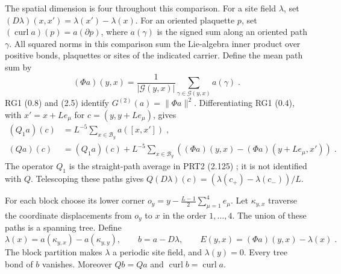 \documentclass[11pt]{article}
\begin{document}
The spatial dimension is four throughout this comparison. For a site field $\lambda$, set $(D\lambda)(x,x')=\lambda(x')-\lambda(x)$. For an oriented plaquette $p$, set $(\operatorname{curl}a)(p)=a(\partial p)$, where $a(\gamma)$ is the signed sum along an oriented path $\gamma$. All squared norms in this comparison sum the Lie-algebra inner product over positive bonds, plaquettes or sites of the indicated carrier. Define the mean path sum by
\begin{equation}\label{eq:covariance-mean-path}
    (\Phi a)(y,x)=\frac{1}{|\mathcal G(y,x)|}
        \sum_{\gamma\in\mathcal G(y,x)}a(\gamma)\;.
\end{equation}
RG1 (0.8) and (2.5) identify $G^{(2)}(a)=\|\Phi a\|^2$. Differentiating RG1 (0.4), with $x'=x+Le_\mu$ for $c=(y,y+Le_\mu)$, gives
\begin{equation}\label{eq:covariance-two-averages}
    \begin{aligned}
        (Q_1a)(c)&=L^{-5}\sum_{x\in\mathcal B_y}a([x,x'])\;,\\
        (Qa)(c)&=(Q_1a)(c)
            +L^{-5}\sum_{x\in\mathcal B_y}
                ((\Phi a)(y,x)-(\Phi a)(y+Le_\mu,x'))\;.
    \end{aligned}
\end{equation}
The operator $Q_1$ is the straight-path average in PRT2 (2.125) \cite{BalabanPRT2}; it is not identified with $Q$. Telescoping these paths gives $Q(D\lambda)(c)=(\lambda(c_+)-\lambda(c_-))/L$.

For each block choose its lower corner $o_y=y-\frac{L-1}{2}\sum_{\mu=1}^4 e_\mu$. Let $\kappa_{y,x}$ traverse the coordinate displacements from $o_y$ to $x$ in the order $1,\ldots,4$. The union of these paths is a spanning tree. Define
\begin{equation}\label{eq:covariance-tree-gauge}
    \lambda(x)=a(\kappa_{y,x})-a(\kappa_{y,y}),
    \qquad b=a-D\lambda,
    \qquad E(y,x)=(\Phi a)(y,x)-\lambda(x)\;.
\end{equation}
The block partition makes $\lambda$ a periodic site field, and $\lambda(y)=0$. Every tree bond of $b$ vanishes. Moreover $Qb=Qa$ and $\operatorname{curl}b=\operatorname{curl}a$.
\end{document}
